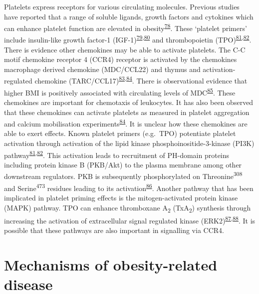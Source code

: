 \documentclass[11pt,twoside]{bristolthesis}
\begin{document}
Platelets express receptors for various circulating molecules. Previous studies have reported that a range of soluble ligands, growth factors and cytokines which can enhance platelet function are elevated in obesity\textsuperscript{\protect\hyperlink{ref-Maury2010a}{78}}. These `platelet primers' include insulin-like growth factor-1 (IGF-1)\textsuperscript{\protect\hyperlink{ref-Frystyk1995}{79},\protect\hyperlink{ref-Hers2007}{80}} and thrombopoietin (TPO)\textsuperscript{\protect\hyperlink{ref-Blair2015}{81},\protect\hyperlink{ref-Pasquet2000}{82}}. There is evidence other chemokines may be able to activate platelets. The C-C motif chemokine receptor 4 (CCR4) receptor is activated by the chemokines macrophage derived chemokine (MDC/CCL22) and thymus and activation-regulated chemokine (TARC/CCL17)\textsuperscript{\protect\hyperlink{ref-Kowalska2000}{83},\protect\hyperlink{ref-Abi-Younes2001}{84}}. There is observational evidence that higher BMI is positively associated with circulating levels of MDC\textsuperscript{\protect\hyperlink{ref-Kitahara2014}{85}}. These chemokines are important for chemotaxis of leukocytes. It has also been observed that these chemokines can activate platelets as measured in platelet aggregation and calcium mobilisation experiments\textsuperscript{\protect\hyperlink{ref-Abi-Younes2001}{84}}. It is unclear how these chemokines are able to exert effects. Known platelet primers (e.g.~TPO) potentiate platelet activation through activation of the lipid kinase phosphoinositide-3-kinase (PI3K) pathway\textsuperscript{\protect\hyperlink{ref-Blair2015}{81},\protect\hyperlink{ref-Pasquet2000}{82}}. This activation leads to recruitment of PH-domain proteins including protein kinase B (PKB/Akt) to the plasma membrane among other downstream regulators. PKB is subsequently phosphorylated on Threonine\textsuperscript{308} and Serine\textsuperscript{473} residues leading to its activation\textsuperscript{\protect\hyperlink{ref-Hemmings2015}{86}}. Another pathway that has been implicated in platelet priming effects is the mitogen-activated protein kinase (MAPK) pathway. TPO can enhance thromboxane A\textsubscript{2} (TxA\textsubscript{2}) synthesis through increasing the activation of extracellular signal regulated kinase (ERK2)\textsuperscript{\protect\hyperlink{ref-Ezumi1998}{87},\protect\hyperlink{ref-VanWilligen2000}{88}}. It is possible that these pathways are also important in signalling via CCR4.

\hypertarget{mechanisms-of-obesity-related-disease}{%
\section{Mechanisms of obesity-related disease}\label{mechanisms-of-obesity-related-disease}}
\end{document}
